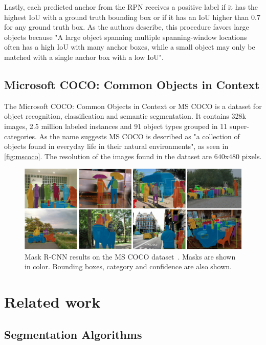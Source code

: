 \documentclass[oneside, english, bibtex]{kththesis}
\begin{document}
Lastly, each predicted anchor from the RPN receives a positive label if it has the highest IoU with a ground truth bounding box or if it has an IoU higher than 0.7 for any ground truth box. As the authors describe, this procedure favors large objects because "A large object spanning multiple spanning-window locations often has a high IoU with many anchor boxes, while a small object may only be matched with a single anchor box with a low IoU".

\subsection{Microsoft COCO: Common Objects in Context}

The Microsoft COCO: Common Objects in Context or MS COCO is a dataset for object recognition, classification and semantic segmentation.
It contains 328k images, 2.5 million labeled instances and 91 object types grouped in 11 super-categories.
As the name suggests MS COCO is described as "a collection of objects found in everyday life in their natural environments", as seen in \autoref{fig:mscoco}.
The resolution of the images found in the dataset are $640$x$480$ pixels.

\begin{figure}[H]
  \begin{center}
    \includegraphics[width=1.0\textwidth]{figures/mscoco.png}
  \end{center}
  \caption{Mask R-CNN results on the MS COCO dataset~\cite{DBLP:journals/corr/HeGDG17}. Masks are shown in color. Bounding boxes, category and confidence are also shown.   }
  \label{fig:mscoco}
\end{figure}


\section{Related work}
\label{sec:relwork}

\subsection{Segmentation Algorithms}
\end{document}
